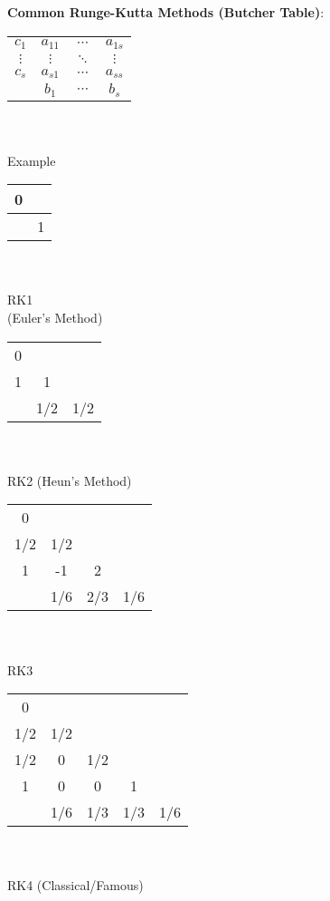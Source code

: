 \documentclass[9pt]{article}
\begin{document}
\textbf{Common Runge-Kutta Methods (Butcher Table)}:

\vspace{-5pt}
\begin{minipage}{0.15\linewidth}
    \centering
    \begin{tabular}{c|ccc}
        $c_1$ & $a_{11}$ & $\cdots$ & $a_{1s}$ \\
        $\vdots$ & $\vdots$ & $\ddots$ & $\vdots$ \\
        $c_s$ & $a_{s1}$ & $\cdots$ & $a_{ss}$ \\
        \hline
            & $b_1$ & $\cdots$ & $b_s$
    \end{tabular}
    \\~\\
    {Example}
\end{minipage}
\hfill
\begin{minipage}{0.15\linewidth}
    \centering
    \begin{tabular}{c|c}
        0 &  \\
        \hline
          & 1
    \end{tabular}
    \\~\\
    {RK1 \\ (Euler's Method)}
\end{minipage}
\hfill
\begin{minipage}{0.15\linewidth}
    \centering
    \begin{tabular}{c|cc}
        0   &    &  \\
        1   & 1   &  \\
        \hline
            & 1/2 & 1/2
    \end{tabular}
    \\~\\
    {RK2 (Heun's Method)}
\end{minipage}
\hfill
\begin{minipage}{0.2\linewidth}
    \centering
    \begin{tabular}{c|ccc}
        0   &    &    &  \\
        1/2 & 1/2 &    &  \\
        1   & -1  & 2   &  \\
        \hline
            & 1/6 & 2/3 & 1/6
    \end{tabular}
    \\~\\
    {RK3}
\end{minipage}
\hfill
\begin{minipage}{0.3\linewidth}
    \centering
    \begin{tabular}{c|cccc}
        0   &    &    &    &  \\
        1/2 & 1/2 &    &    &  \\
        1/2 & 0   & 1/2 &    &  \\
        1   & 0   & 0   & 1   &  \\
        \hline
            & 1/6 & 1/3 & 1/3 & 1/6
    \end{tabular}
    \\~\\
    {RK4 (Classical/Famous)}
\end{minipage}
\end{document}
